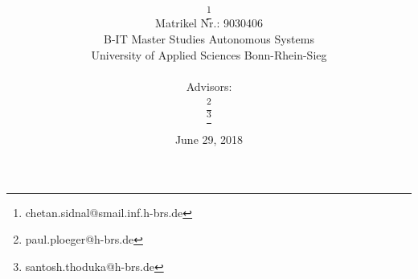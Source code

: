 \title{\PaperTitle\\\PaperSubject}

\author{
\href{\PaperMainWriterEMail}{\PaperMainWriter \footnote{\href{\PaperMainWriterEMail} {chetan.sidnal@smail.inf.h-brs.de}}} \\
Matrikel Nr.: 9030406 \vspace{3.5cm} \\ 
B-IT Master Studies Autonomous Systems \vspace{0.5cm} \\ 
University of Applied Sciences Bonn-Rhein-Sieg\\  \vspace{0.1cm} \\
\setcounter{footnote}{6}
Advisors: \\
\href{\PaperLecturerEMailOne}{\PaperLecturerOne \footnote{\href{\PaperLecturerEMailOne} {paul.ploeger@h-brs.de}}} \\
\href{\PaperLecturerEMailThree}{\PaperLecturerThree \footnote{\href{\PaperLecturerEMailThree} {santosh.thoduka@h-brs.de}}} \\
}

\date{June 29, 2018}
\maketitle
\newpage